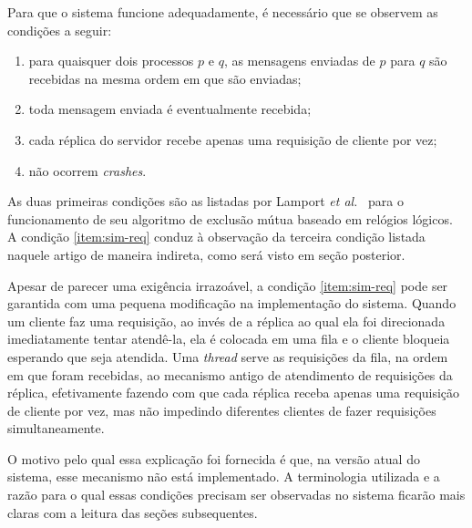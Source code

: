 \documentclass[../main.tex]{subfiles}
\begin{document}
Para que o sistema funcione adequadamente, é necessário que se observem as condições a seguir:

\begin{enumerate}
  \item
    para quaisquer dois processos $p$ e $q$, as mensagens enviadas de $p$ para $q$ são recebidas na mesma ordem em que são enviadas;

  \item
    toda mensagem enviada é eventualmente recebida;

  \item \label{item:sim-req}
    cada réplica do servidor recebe apenas uma requisição de cliente por vez;

  \item
    não ocorrem \textit{crashes}.
\end{enumerate}

As duas primeiras condições são as listadas por Lamport \textit{et al.}~\cite{lamport-logical-clocks} para o funcionamento de seu algoritmo de exclusão mútua baseado em relógios lógicos.
A condição \ref{item:sim-req} conduz à observação da terceira condição listada naquele artigo de maneira indireta, como será visto em seção posterior.

Apesar de parecer uma exigência irrazoável, a condição \ref{item:sim-req} pode ser garantida com uma pequena modificação na implementação do sistema.
Quando um cliente faz uma requisição, ao invés de a réplica ao qual ela foi direcionada imediatamente tentar atendê-la, ela é colocada em uma fila e o cliente bloqueia esperando que seja atendida.
Uma \textit{thread} serve as requisições da fila, na ordem em que foram recebidas, ao mecanismo antigo de atendimento de requisições da réplica, efetivamente fazendo com que cada réplica receba apenas uma requisição de cliente por vez, mas não impedindo diferentes clientes de fazer requisições simultaneamente.

O motivo pelo qual essa explicação foi fornecida é que, na versão atual do sistema, esse mecanismo não está implementado.
A terminologia utilizada e a razão para o qual essas condições precisam ser observadas no sistema ficarão mais claras com a leitura das seções subsequentes.
\end{document}

